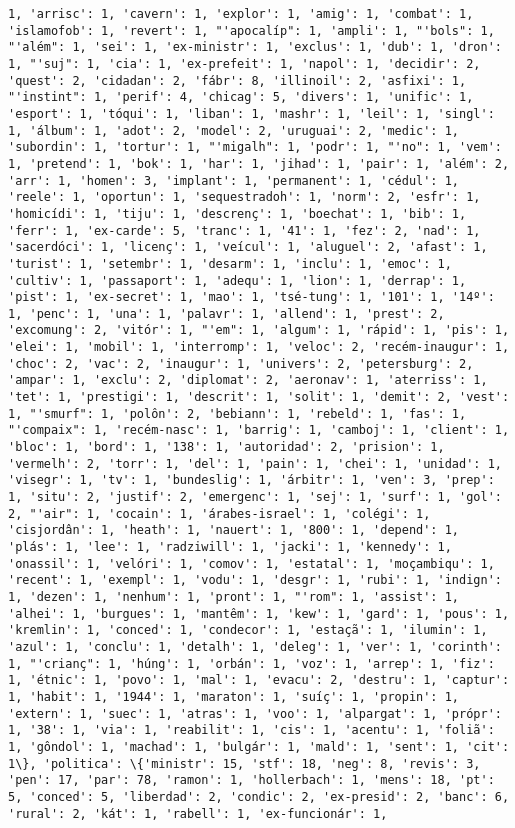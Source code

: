 \documentclass[11pt]{article}
\begin{document}
\begin{Verbatim}[commandchars=\\\{\}]
1, 'arrisc': 1, 'cavern': 1, 'explor': 1, 'amig': 1, 'combat': 1, 'islamofob': 1, 'revert': 1, "'apocalíp": 1, 'ampli': 1, "'bols": 1, "'além": 1, 'sei': 1, 'ex-ministr': 1, 'exclus': 1, 'dub': 1, 'dron': 1, "'suj": 1, 'cia': 1, 'ex-prefeit': 1, 'napol': 1, 'decidir': 2, 'quest': 2, 'cidadan': 2, 'fábr': 8, 'illinoil': 2, 'asfixi': 1, "'instint": 1, 'perif': 4, 'chicag': 5, 'divers': 1, 'unific': 1, 'esport': 1, 'tóqui': 1, 'liban': 1, 'mashr': 1, 'leil': 1, 'singl': 1, 'álbum': 1, 'adot': 2, 'model': 2, 'uruguai': 2, 'medic': 1, 'subordin': 1, 'tortur': 1, "'migalh": 1, 'podr': 1, "'no": 1, 'vem': 1, 'pretend': 1, 'bok': 1, 'har': 1, 'jihad': 1, 'pair': 1, 'além': 2, 'arr': 1, 'homen': 3, 'implant': 1, 'permanent': 1, 'cédul': 1, 'reele': 1, 'oportun': 1, 'sequestradoh': 1, 'norm': 2, 'esfr': 1, 'homicídi': 1, 'tiju': 1, 'descrenç': 1, 'boechat': 1, 'bib': 1, 'ferr': 1, 'ex-carde': 5, 'tranc': 1, '41': 1, 'fez': 2, 'nad': 1, 'sacerdóci': 1, 'licenç': 1, 'veícul': 1, 'aluguel': 2, 'afast': 1, 'turist': 1, 'setembr': 1, 'desarm': 1, 'inclu': 1, 'emoc': 1, 'cultiv': 1, 'passaport': 1, 'adequ': 1, 'lion': 1, 'derrap': 1, 'pist': 1, 'ex-secret': 1, 'mao': 1, 'tsé-tung': 1, '101': 1, '14º': 1, 'penc': 1, 'una': 1, 'palavr': 1, 'allend': 1, 'prest': 2, 'excomung': 2, 'vitór': 1, "'em": 1, 'algum': 1, 'rápid': 1, 'pis': 1, 'elei': 1, 'mobil': 1, 'interromp': 1, 'veloc': 2, 'recém-inaugur': 1, 'choc': 2, 'vac': 2, 'inaugur': 1, 'univers': 2, 'petersburg': 2, 'ampar': 1, 'exclu': 2, 'diplomat': 2, 'aeronav': 1, 'aterriss': 1, 'tet': 1, 'prestigi': 1, 'descrit': 1, 'solit': 1, 'demit': 2, 'vest': 1, "'smurf": 1, 'polôn': 2, 'bebiann': 1, 'rebeld': 1, 'fas': 1, "'compaix": 1, 'recém-nasc': 1, 'barrig': 1, 'camboj': 1, 'client': 1, 'bloc': 1, 'bord': 1, '138': 1, 'autoridad': 2, 'prision': 1, 'vermelh': 2, 'torr': 1, 'del': 1, 'pain': 1, 'chei': 1, 'unidad': 1, 'visegr': 1, 'tv': 1, 'bundeslig': 1, 'árbitr': 1, 'ven': 3, 'prep': 1, 'situ': 2, 'justif': 2, 'emergenc': 1, 'sej': 1, 'surf': 1, 'gol': 2, "'air": 1, 'cocain': 1, 'árabes-israel': 1, 'colégi': 1, 'cisjordân': 1, 'heath': 1, 'nauert': 1, '800': 1, 'depend': 1, 'plás': 1, 'lee': 1, 'radziwill': 1, 'jacki': 1, 'kennedy': 1, 'onassil': 1, 'velóri': 1, 'comov': 1, 'estatal': 1, 'moçambiqu': 1, 'recent': 1, 'exempl': 1, 'vodu': 1, 'desgr': 1, 'rubi': 1, 'indign': 1, 'dezen': 1, 'nenhum': 1, 'pront': 1, "'rom": 1, 'assist': 1, 'alhei': 1, 'burgues': 1, 'mantêm': 1, 'kew': 1, 'gard': 1, 'pous': 1, 'kremlin': 1, 'conced': 1, 'condecor': 1, 'estaçã': 1, 'ilumin': 1, 'azul': 1, 'conclu': 1, 'detalh': 1, 'deleg': 1, 'ver': 1, 'corinth': 1, "'crianç": 1, 'húng': 1, 'orbán': 1, 'voz': 1, 'arrep': 1, 'fiz': 1, 'étnic': 1, 'povo': 1, 'mal': 1, 'evacu': 2, 'destru': 1, 'captur': 1, 'habit': 1, '1944': 1, 'maraton': 1, 'suíç': 1, 'propin': 1, 'extern': 1, 'suec': 1, 'atras': 1, 'voo': 1, 'alpargat': 1, 'própr': 1, '38': 1, 'via': 1, 'reabilit': 1, 'cis': 1, 'acentu': 1, 'foliã': 1, 'gôndol': 1, 'machad': 1, 'bulgár': 1, 'mald': 1, 'sent': 1, 'cit': 1\}, 'politica': \{'ministr': 15, 'stf': 18, 'neg': 8, 'revis': 3, 'pen': 17, 'par': 78, 'ramon': 1, 'hollerbach': 1, 'mens': 18, 'pt': 5, 'conced': 5, 'liberdad': 2, 'condic': 2, 'ex-presid': 2, 'banc': 6, 'rural': 2, 'kát': 1, 'rabell': 1, 'ex-funcionár': 1, 
\end{Verbatim}
\end{document}
